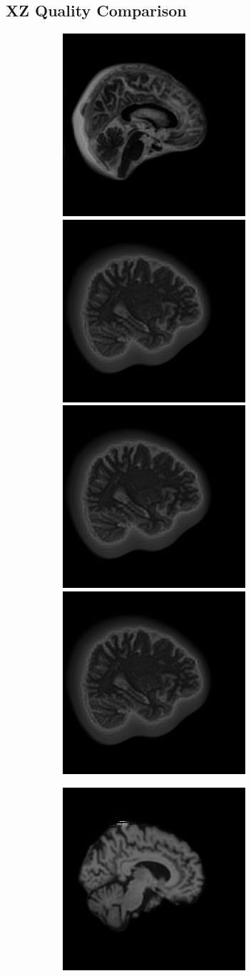 \documentclass[12pt, fleqn, titlepage]{article}
\newcommand\skipper{1.4pt}
\newcommand\ripper{2.5pt}
\begin{document}
\subsection{XZ Quality Comparison}\label{xz_generated}
\begin{figure}[H]
	\centering
	\begin{subfigure}[b]{0.7\textwidth}
		\centering
		\includegraphics[width=0.22\linewidth]{imgs/1.5T_bilinear}
		\hskip\skipper
		\includegraphics[width=0.22\linewidth]{imgs/3T_bilinear}
		\hskip\skipper
		\includegraphics[width=0.22\linewidth]{imgs/3T_bilinear}
		\hskip\skipper
		\includegraphics[width=0.22\linewidth]{imgs/3T_bilinear}
	\end{subfigure}
	\vskip\ripper
	\begin{subfigure}[b]{0.7\textwidth}
		\centering
		\includegraphics[width=0.22\linewidth]{imgs/1.5T_no_noise}

\end{subfigure}
\end{figure}
\end{document}
